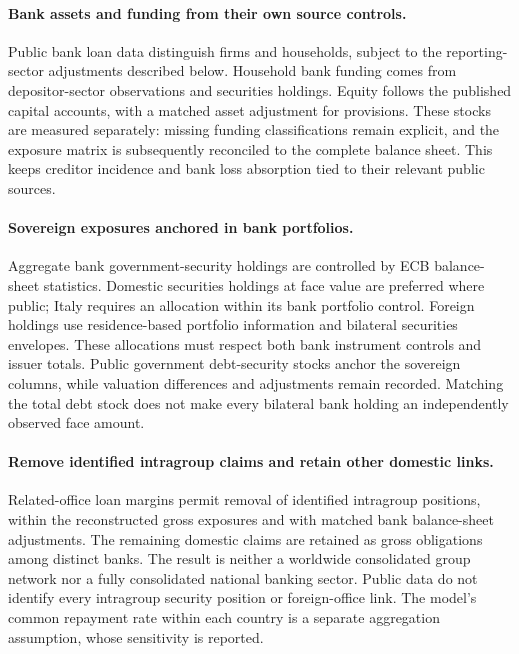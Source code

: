 \paragraph{Bank assets and funding from their own source controls.}
Public bank loan data distinguish firms and households, subject to the reporting-sector adjustments described below. Household bank funding comes from depositor-sector observations and securities holdings. Equity follows the published capital accounts, with a matched asset adjustment for provisions. These stocks are measured separately: missing funding classifications remain explicit, and the exposure matrix is subsequently reconciled to the complete balance sheet. This keeps creditor incidence and bank loss absorption tied to their relevant public sources.

\paragraph{Sovereign exposures anchored in bank portfolios.}
Aggregate bank government-security holdings are controlled by ECB balance-sheet statistics. Domestic securities holdings at face value are preferred where public; Italy requires an allocation within its bank portfolio control. Foreign holdings use residence-based portfolio information and bilateral securities envelopes. These allocations must respect both bank instrument controls and issuer totals. Public government debt-security stocks anchor the sovereign columns, while valuation differences and adjustments remain recorded. Matching the total debt stock does not make every bilateral bank holding an independently observed face amount.

\paragraph{Remove identified intragroup claims and retain other domestic links.}
Related-office loan margins permit removal of identified intragroup positions, within the reconstructed gross exposures and with matched bank balance-sheet adjustments. The remaining domestic claims are retained as gross obligations among distinct banks. The result is neither a worldwide consolidated group network nor a fully consolidated national banking sector. Public data do not identify every intragroup security position or foreign-office link. The model's common repayment rate within each country is a separate aggregation assumption, whose sensitivity is reported.

